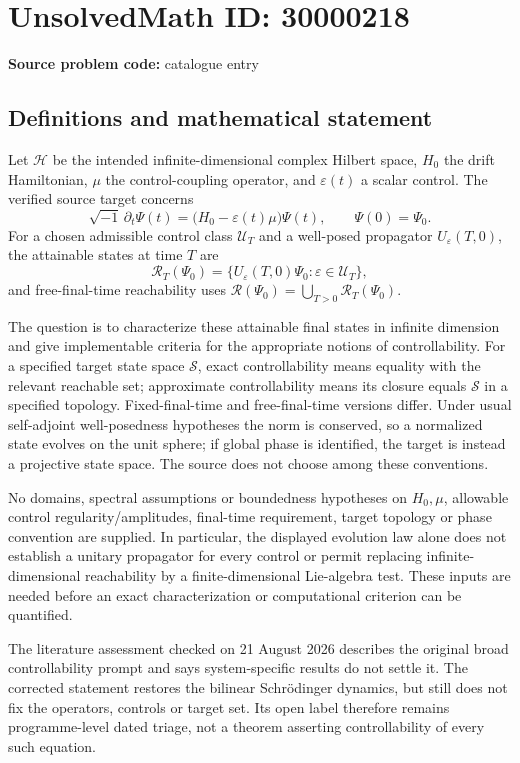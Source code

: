 \documentclass[11pt]{article}
\begin{document}
\section*{UnsolvedMath ID: 30000218}
\textbf{Source problem code:} catalogue entry
\subsection{Definitions and mathematical statement}
Let $\mathcal H$ be the intended infinite-dimensional complex Hilbert space, $H_0$ the drift Hamiltonian, $\mu$ the control-coupling operator, and $\varepsilon(t)$ a scalar control. The verified source target concerns
\[
 \sqrt{-1}\,\partial_t\Psi(t)=\bigl(H_0-\varepsilon(t)\mu\bigr)\Psi(t),
 \qquad\Psi(0)=\Psi_0.
\]
For a chosen admissible control class $\mathcal U_T$ and a well-posed propagator $U_\varepsilon(T,0)$, the attainable states at time $T$ are
\[
 \mathcal R_T(\Psi_0)=\{U_\varepsilon(T,0)\Psi_0:
                                     \varepsilon\in\mathcal U_T\},
\]
and free-final-time reachability uses $\mathcal R(\Psi_0)=\bigcup_{T>0}\mathcal R_T(\Psi_0)$.

The question is to characterize these attainable final states in infinite dimension and give implementable criteria for the appropriate notions of controllability. For a specified target state space $\mathcal S$, exact controllability means equality with the relevant reachable set; approximate controllability means its closure equals $\mathcal S$ in a specified topology. Fixed-final-time and free-final-time versions differ. Under usual self-adjoint well-posedness hypotheses the norm is conserved, so a normalized state evolves on the unit sphere; if global phase is identified, the target is instead a projective state space. The source does not choose among these conventions.

No domains, spectral assumptions or boundedness hypotheses on $H_0,\mu$, allowable control regularity/amplitudes, final-time requirement, target topology or phase convention are supplied. In particular, the displayed evolution law alone does not establish a unitary propagator for every control or permit replacing infinite-dimensional reachability by a finite-dimensional Lie-algebra test. These inputs are needed before an exact characterization or computational criterion can be quantified.

The literature assessment checked on 21 August 2026 describes the original broad controllability prompt and says system-specific results do not settle it. The corrected statement restores the bilinear Schr\"odinger dynamics, but still does not fix the operators, controls or target set. Its open label therefore remains programme-level dated triage, not a theorem asserting controllability of every such equation.
\end{document}
